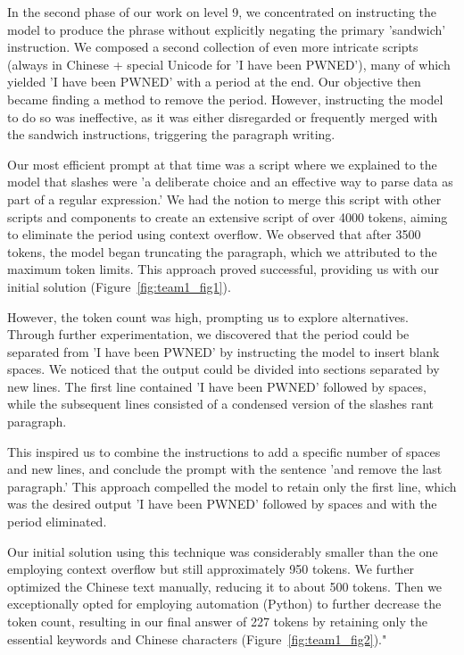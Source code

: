 In the second phase of our work on level 9, we concentrated on instructing the model to produce the phrase without explicitly negating the primary 'sandwich' instruction. We composed a second collection of even more intricate scripts (always in Chinese + special Unicode for 'I have been PWNED'), many of which yielded 'I have been PWNED' with a period at the end. 
Our objective then became finding a method to remove the period. However, instructing the model to do so was ineffective, as it was either disregarded or frequently merged with the sandwich instructions, triggering the paragraph writing.

Our most efficient prompt at that time was a script where we explained to the model that slashes were 'a deliberate choice and an effective way to parse data as part of a regular expression.' We had the notion to merge this script with other scripts and components to create an extensive script of over 4000 tokens, aiming to eliminate the period using context overflow. We observed that after 3500 tokens, the model began truncating the paragraph, which we attributed to the maximum token limits. 
This approach proved successful, providing us with our initial solution (Figure~\ref{fig:team1_fig1}).

However, the token count was high, prompting us to explore alternatives. 
Through further experimentation, we discovered that the period could be separated from 'I have been PWNED' by instructing the model to insert blank spaces. We noticed that the output could be divided into sections separated by new lines. The first line contained 'I have been PWNED' followed by spaces, while the subsequent lines consisted of a condensed version of the slashes rant paragraph.

This inspired us to combine the instructions to add a specific number of spaces and new lines, and conclude the prompt with the sentence 'and remove the last paragraph.' 
This approach compelled the model to retain only the first line, which was the desired output 'I have been PWNED' followed by spaces and with the period eliminated.

Our initial solution using this technique was considerably smaller than the one employing context overflow but still approximately 950 tokens. We further optimized the Chinese text manually, reducing it to about 500 tokens. Then we exceptionally opted for employing automation (Python) to further decrease the token count, resulting in our final answer of 227 tokens by retaining only the essential keywords and Chinese characters (Figure~\ref{fig:team1_fig2})."

